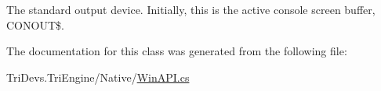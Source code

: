 The standard output device. Initially, this is the active console screen buffer, C\-O\-N\-O\-U\-T\$. 



The documentation for this class was generated from the following file\-:\begin{DoxyCompactItemize}
\item 
Tri\-Devs.\-Tri\-Engine/\-Native/\hyperlink{_win_a_p_i_8cs}{Win\-A\-P\-I.\-cs}\end{DoxyCompactItemize}
